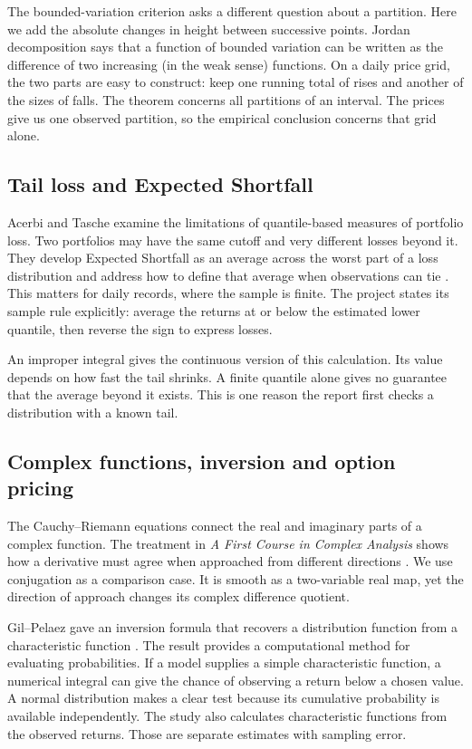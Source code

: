\documentclass[12pt,a4paper]{article}
\newcommand{\topic}[1]{\clearpage\subsection{#1}}
\begin{document}
The bounded-variation criterion asks a different question about a partition. Here we add the absolute changes in height between successive points. Jordan decomposition \cite{royden} says that a function of bounded variation can be written as the difference of two increasing (in the weak sense) functions. On a daily price grid, the two parts are easy to construct: keep one running total of rises and another of the sizes of falls. The theorem concerns all partitions of an interval. The prices give us one observed partition, so the empirical conclusion concerns that grid alone.
\subsection{Tail loss and Expected Shortfall}
Acerbi and Tasche examine the limitations of quantile-based measures of portfolio loss. Two portfolios may have the same cutoff and very different losses beyond it. They develop Expected Shortfall as an average across the worst part of a loss distribution and address how to define that average when observations can tie \cite{acerbi}. This matters for daily records, where the sample is finite. The project states its sample rule explicitly: average the returns at or below the estimated lower quantile, then reverse the sign to express losses.
 
An improper integral gives the continuous version of this calculation. Its value depends on how fast the tail shrinks. A finite quantile alone gives no guarantee that the average beyond it exists. This is one reason the report first checks a distribution with a known tail.
\topic{Complex functions, inversion and option pricing}
The Cauchy--Riemann equations connect the real and imaginary parts of a complex function. The treatment in \textit{A First Course in Complex Analysis} shows how a derivative must agree when approached from different directions \cite{complex}. We use conjugation as a comparison case. It is smooth as a two-variable real map, yet the direction of approach changes its complex difference quotient.
 
Gil--Pelaez gave an inversion formula that recovers a distribution function from a characteristic function \cite{gil}. The result provides a computational method for evaluating probabilities. If a model supplies a simple characteristic function, a numerical integral can give the chance of observing a return below a chosen value. A normal distribution makes a clear test because its cumulative probability is available independently. The study also calculates characteristic functions from the observed returns. Those are separate estimates with sampling error.
 
\end{document}
